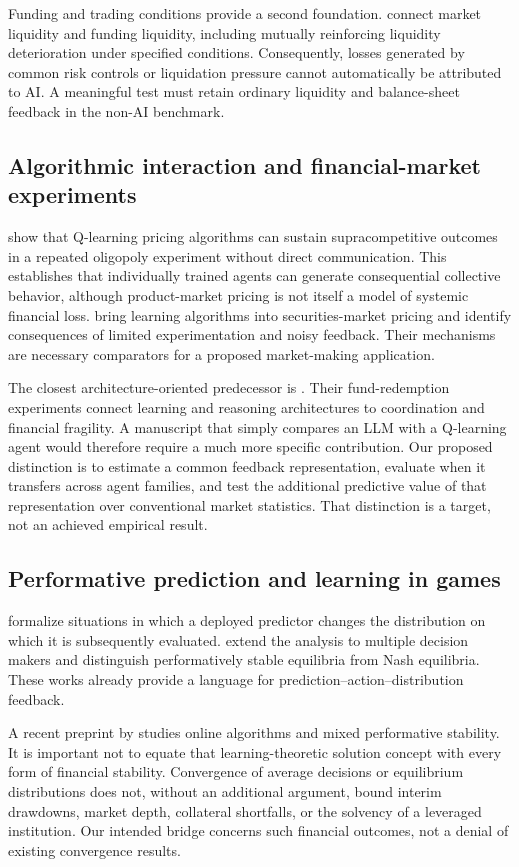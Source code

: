 \documentclass[11pt,a4paper]{article}
\theoremstyle{definition}
\theoremstyle{remark}
\begin{document}
Funding and trading conditions provide a second foundation. \citet{brunnermeier2009} connect market liquidity and funding liquidity, including mutually reinforcing liquidity deterioration under specified conditions. Consequently, losses generated by common risk controls or liquidation pressure cannot automatically be attributed to AI. A meaningful test must retain ordinary liquidity and balance-sheet feedback in the non-AI benchmark.

\subsection{Algorithmic interaction and financial-market experiments}
\citet{calvano2020} show that Q-learning pricing algorithms can sustain supracompetitive outcomes in a repeated oligopoly experiment without direct communication. This establishes that individually trained agents can generate consequential collective behavior, although product-market pricing is not itself a model of systemic financial loss. \citet{colliard2026} bring learning algorithms into securities-market pricing and identify consequences of limited experimentation and noisy feedback. Their mechanisms are necessary comparators for a proposed market-making application.

The closest architecture-oriented predecessor is \citet{anand2026}. Their fund-redemption experiments connect learning and reasoning architectures to coordination and financial fragility. A manuscript that simply compares an LLM with a Q-learning agent would therefore require a much more specific contribution. Our proposed distinction is to estimate a common feedback representation, evaluate when it transfers across agent families, and test the additional predictive value of that representation over conventional market statistics. That distinction is a target, not an achieved empirical result.

\subsection{Performative prediction and learning in games}
\citet{perdomo2020} formalize situations in which a deployed predictor changes the distribution on which it is subsequently evaluated. \citet{narang2023} extend the analysis to multiple decision makers and distinguish performatively stable equilibria from Nash equilibria. These works already provide a language for prediction--action--distribution feedback.

A recent preprint by \citet{farina2026} studies online algorithms and mixed performative stability. It is important not to equate that learning-theoretic solution concept with every form of financial stability. Convergence of average decisions or equilibrium distributions does not, without an additional argument, bound interim drawdowns, market depth, collateral shortfalls, or the solvency of a leveraged institution. Our intended bridge concerns such financial outcomes, not a denial of existing convergence results.
\end{document}
